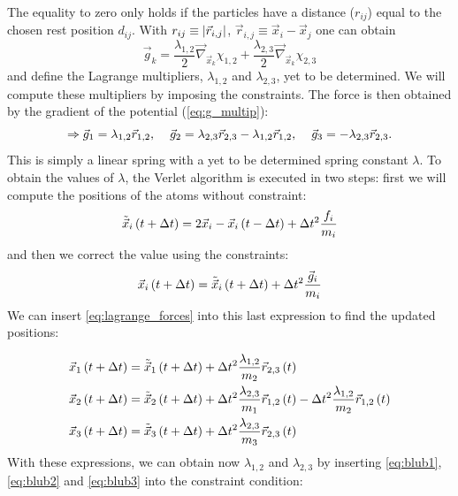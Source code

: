 The equality to zero only holds if the particles have a distance ($r_{ij}$)  equal to the chosen rest position $d_{ij}$. With $r_{ij}\equiv \left|\vec{r}_{i,j}\right|$, $\vec{r}_{i,j} \equiv \vec{x}_{i}  -\vec{x}_{j} $ one can obtain
\begin{equation}
\vec{g}_k = \frac{\lambda_{1,2} }{2} \vec{\nabla} _{\vec{x}_k} \chi_{1,2}+
                   \frac{\lambda_{2,3} }{2} \vec{\nabla} _{\vec{x}_k} \chi_{2,3}
\label{eq:g_multip}
\end{equation}
and define the Lagrange multipliers, $\lambda_{1,2}$ and $\lambda_{2,3}$, yet to be determined. We will compute these multipliers by imposing the constraints. The force is then obtained by the gradient of the potential (\eqref{eq:g_multip}):
 \begin{equation}
 \Rightarrow \vec{g}_1 = \lambda_{1,2} \vec{r}_{1,2}, \hspace{0.4cm} 
\vec{g}_2 = \lambda_{2,3} \vec{r}_{2,3} - \lambda_{1,2} \vec{r}_{1,2}, \hspace{0.4cm} 
\vec{g}_3 = - \lambda_{2,3} \vec{r}_{2,3}.
\label{eq:lagrange_forces}
\end{equation}
 This is simply a linear spring with a  yet to be determined spring constant $\lambda$. To obtain the values of $\lambda$, the Verlet algorithm is executed in two steps: first we will compute the positions of the atoms without constraint:
 $$
\tilde{\vec{x}}_i \left(t+\Delta t\right) = 2\vec{x}_i  - \vec{x}_i\left(t-\Delta t\right) + \Delta t ^2 \frac{f_i}{m_i} 
$$ 
and then we correct the value using the constraints:
$$
\vec{x}_i \left(t+\Delta t\right) = \tilde{\vec{x}}_i \left(t+\Delta t\right) + \Delta t ^2 \frac{\vec{g}_i}{m_i} 
$$
We can insert \eqref{eq:lagrange_forces} into this last expression to find the updated positions:

\begin{align}
\vec{x}_1 \left(t+\Delta t\right) &= \tilde{\vec{x}}_1 \left(t+\Delta t\right) + \Delta t ^2 \frac{\lambda_{1,2}}{m_2} \vec{r}_{2,3}\left(t\right) \label{eq:blub1}\\
\vec{x}_2 \left(t+\Delta t\right) &= \tilde{\vec{x}}_2 \left(t+\Delta t\right) + \Delta t ^2 \frac{\lambda_{2,3}}{m_1} \vec{r}_{1,2}\left(t\right) -  \Delta t ^2 \frac{\lambda_{1,2}}{m_2} \vec{r}_{1,2}\left(t\right) \label{eq:blub2} \\
\vec{x}_3 \left(t+\Delta t\right) &= \tilde{\vec{x}}_3 \left(t+\Delta t\right) + \Delta t ^2 \frac{\lambda_{2,3}}{m_3} \vec{r}_{2,3}\left(t\right)\label{eq:blub3}
\end{align}
With these expressions, we can obtain now $\lambda_{1,2}$ and $\lambda_{2,3}$ by inserting \eqref{eq:blub1}, \eqref{eq:blub2} and \eqref{eq:blub3} into the constraint condition:


